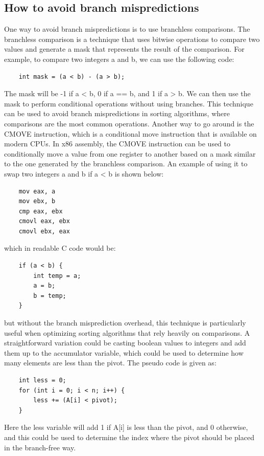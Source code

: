 \documentclass[a4paper,oneside,12pt]{book}
\begin{document}
\subsection{How to avoid branch mispredictions}
One way to avoid branch mispredictions is to use branchless comparisons. The branchless comparison is a technique that uses bitwise operations to compare two values and generate a mask that represents the result of the comparison.
For example, to compare two integers a and b, we can use the following code:
\begin{verbatim}
    int mask = (a < b) - (a > b);
\end{verbatim}
The mask will be -1 if a < b, 0 if a == b, and 1 if a > b. We can then use the mask to perform conditional operations without using branches.
This technique can be used to avoid branch mispredictions in sorting algorithms, where comparisons are the most common operations.
Another way to go around is the CMOVE instruction, which is a conditional move instruction that is available on modern CPUs. In x86 assembly, the CMOVE instruction can be used to conditionally move a value from one register to another based on a mask similar to the one generated by the branchless comparison.
An example of using it to swap two integers a and b if a < b is shown below:
\begin{verbatim}
    mov eax, a
    mov ebx, b
    cmp eax, ebx
    cmovl eax, ebx
    cmovl ebx, eax
\end{verbatim}
which in readable C code would be:
\begin{verbatim}
    if (a < b) {
        int temp = a;
        a = b;
        b = temp;
    }
\end{verbatim}
but without the branch misprediction overhead, this technique is particularly useful when optimizing sorting algorithms that rely heavily on comparisons.
A straightforward variation could be casting boolean values to integers and add them up to the accumulator variable, which could be used to determine how many elements are less than the pivot.
The pseudo code is given as:
\begin{verbatim}
    int less = 0;
    for (int i = 0; i < n; i++) {
        less += (A[i] < pivot);
    }
\end{verbatim}
Here the less variable will add 1 if A[i] is less than the pivot, and 0 otherwise, and this could be used to determine the index where the pivot should be placed in the branch-free way.
\end{document}
